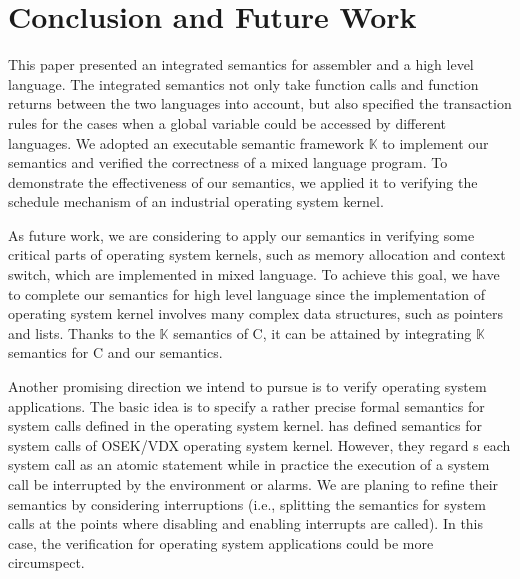 \documentclass[letterpaper, 10 pt, conference]{IEEEtran}
\begin{document}
\section{Conclusion and Future Work}
\par This paper presented an integrated semantics for assembler and a high level language. The integrated semantics not only take function calls and function returns between the two languages into account, but also specified the transaction rules for the cases when a global variable could be accessed by different languages. We adopted an executable semantic framework $\mathbb{K}$ to implement our semantics and verified the correctness of a mixed language program. To demonstrate the effectiveness of our semantics, we applied it to verifying the schedule mechanism of an industrial operating system kernel.
\par As future work, we are considering to
 apply our semantics in verifying some critical parts of operating system kernels, such as memory allocation and context switch, which are implemented in mixed language. To achieve this goal, we have to complete our semantics for high level language since the implementation of operating system kernel involves many complex data structures, such as pointers and lists. Thanks to the $\mathbb{K}$
semantics of C, it can be attained by integrating $\mathbb{K}$ semantics for C and our semantics.
\par Another promising direction we intend to pursue is to verify operating system applications. The basic idea is to specify a rather precise formal semantics for system calls defined in the operating system kernel. \cite{} has defined semantics for system calls of OSEK/VDX operating system kernel. However, they regard s each system call as an atomic statement while
in practice the execution of a system call be interrupted by the environment or alarms. We are planing to refine their semantics by considering interruptions (i.e., splitting the semantics for system calls at the points where disabling and enabling interrupts are called). In this case, the verification for operating system applications could be more circumspect.
\end{document}
